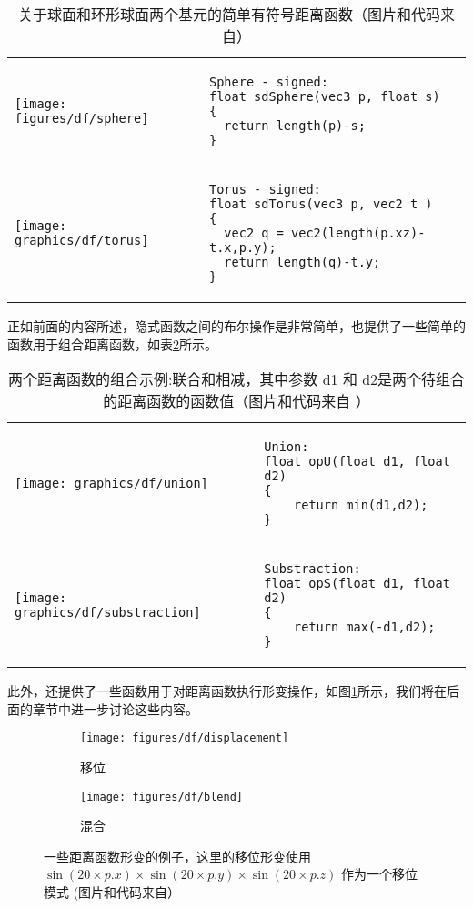 \begin{table}
\begin{tabular}{m{3.0cm}m{}} 
\texttt{[image: figures/df/sphere]} &
	 \begin{lstlisting}
Sphere - signed:
float sdSphere(vec3 p, float s)
{
  return length(p)-s;
}
\end{lstlisting} \\
   \texttt{[image: graphics/df/torus]} & 
    \begin{lstlisting}
Torus - signed:
float sdTorus(vec3 p, vec2 t )
{
  vec2 q = vec2(length(p.xz)-t.x,p.y);
  return length(q)-t.y;
}
   \end{lstlisting}
\end{tabular}
\caption{关于球面和环形球面两个基元的简单有符号距离函数（图片和代码来自\cite{w:distance-function}）}
\label{t:df-dist-function-1}
\end{table}

正如前面的内容所述，隐式函数之间的布尔操作是非常简单，\cite{w:distance-function}也提供了一些简单的函数用于组合距离函数，如表\ref{t:df-dist-function-2}所示。

\begin{table}
\begin{tabular}{m{3cm}m{}} 
\texttt{[image: graphics/df/union]} &
	 \begin{lstlisting}
Union:
float opU(float d1, float d2)
{
    return min(d1,d2);
}
\end{lstlisting} \\
   \texttt{[image: graphics/df/substraction]} & 
    \begin{lstlisting}
Substraction:
float opS(float d1, float d2)
{
    return max(-d1,d2);
}
   \end{lstlisting}
\end{tabular}
\caption{两个距离函数的组合示例:联合和相减，其中参数 d1 和 d2是两个待组合的距离函数的函数值（图片和代码来自 \cite{w:distance-function}）}
\label{t:df-dist-function-2}
\end{table}

此外，\cite{w:distance-function}还提供了一些函数用于对距离函数执行形变操作，如图\ref{f:df-disform}所示，我们将在后面的章节中进一步讨论这些内容。

\begin{figure}
	\begin{subfigure}[b]{0.5\textwidth}
		\texttt{[image: figures/df/displacement]}
		\caption{移位}
	\end{subfigure}
	\begin{subfigure}[b]{0.5\textwidth}
		\texttt{[image: figures/df/blend]}
		\caption{混合}
	\end{subfigure}
	\caption{一些距离函数形变的例子，这里的移位形变使用 $\sin(20 \times p.x)\times\sin(20\times p.y)\times\sin(20\times p.z)$ 作为一个移位模式 (图片和代码来自\cite{w:distance-function}）}
	\label{f:df-disform}
\end{figure}


